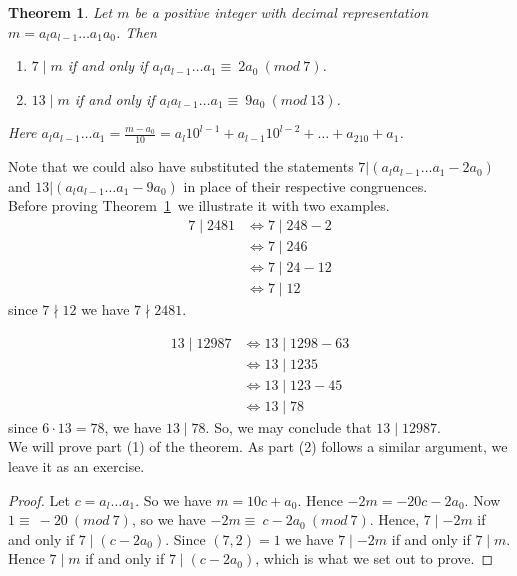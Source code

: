 \documentclass[12pt,letterpaper]{book}
\newtheorem{theorem}{Theorem}
\begin{document}
\begin{theorem} \label{divs2} Let $m$ be a positive integer with decimal representation\\ $m=a_la_{l-1}\ldots a_1a_0$. Then
\begin{enumerate}
\item  $7\mid m$ if and only if $a_la_{l-1}\ldots a_1\equiv~2a_0~(mod~7)$.

\item  $13\mid m$ if and only if $a_la_{l-1}\ldots a_1\equiv~9a_0~(mod~13)$.
\end{enumerate}
Here $a_la_{l-1}\ldots a_1=\displaystyle\frac{m-a_0}{10}=a_l10^{l-1}+a_{l-1}10^{l-2}+\ldots+a_210+a_1$.
\end{theorem}
Note that we could also have substituted the statements $7|(a_la_{l-1}\ldots a_1-2a_0)$ and $13|(a_la_{l-1}\ldots a_1-9a_0)$ in place of their respective congruences.\\
Before proving Theorem~\ref{divs2}~we illustrate it with two examples.
\begin{equation*}
\begin{split} 7\mid 2481 &\Leftrightarrow 7\mid 248-2 \\ &\Leftrightarrow 7\mid
246 \\ &\Leftrightarrow 7\mid 24-12 \\ &\Leftrightarrow 7\mid 12
\end{split}
\end{equation*} since $7\nmid 12$ we have $7\nmid 2481$.

\begin{equation*}
\begin{split} 13\mid 12987 &\Leftrightarrow 13\mid 1298-63 \\ &\Leftrightarrow
13\mid 1235 \\ &\Leftrightarrow 13\mid 123-45 \\ &\Leftrightarrow 13\mid 78
\end{split}
\end{equation*} since $6\cdot 13=78$, we have $13\mid 78$. So, we may conclude that $13\mid 12987$.\\
We will prove part (1) of the theorem.  As part (2) follows a similar argument, we leave it as an exercise.

\begin{proof}Let $c=a_l\ldots a_1$. So we have
$m=10c+a_0$. Hence $-2m=-20c-2a_0$. Now $1\equiv~-20~(mod~7)$, so we have $-2m\equiv~c-2a_0~(mod~7)$.  Hence, $7\mid -2m$ if and only if $7\mid (c-2a_0)$. Since $(7,2)=1$ we have $7\mid -2m$ if and only if $7\mid m$. Hence $7\mid m$ if and only if $7\mid (c-2a_0)$, which is what we set out to prove.   
\end{proof}
\end{document}
